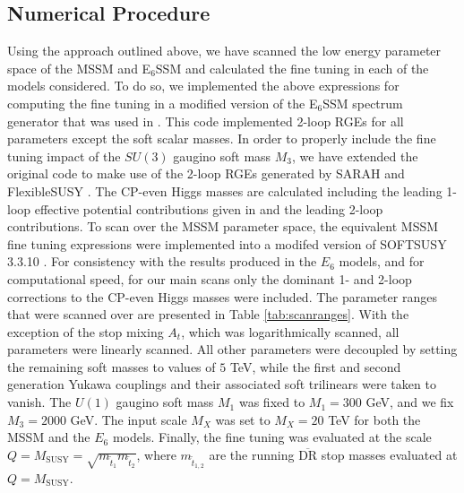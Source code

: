 \documentclass[preprint,amsmath,amssymb,aps,superscriptaddress,prd,showpacs,floatfix]{revtex4-1}
\begin{document}
\subsection{\label{subsec:numericalprocedure}Numerical Procedure}
Using the approach outlined above, we have scanned the low energy parameter space of the MSSM and E$_6$SSM and calculated the fine tuning in each of the models considered. To do so, we implemented the above expressions for computing the fine tuning in a modified version of the E$_6$SSM spectrum generator that was used in \cite{Athron:2013ipa}. This code implemented 2-loop RGEs for all parameters except the soft scalar masses. In order to properly include the fine tuning impact of the $SU(3)$ gaugino soft mass $M_3$, we have extended the original code to make use of the 2-loop RGEs generated by SARAH \cite{Staub:2009bi,Staub:2010jh,Staub:2012pb,Staub:2013tta} and FlexibleSUSY \cite{Athron:2014yba}. The CP-even Higgs masses are calculated including the leading 1-loop effective potential contributions given in \cite{Athron:2009bs} and the leading 2-loop contributions. To scan over the MSSM parameter space, the equivalent MSSM fine tuning expressions were implemented into a modifed version of SOFTSUSY 3.3.10 \cite{Allanach:2001kg,Allanach:2013kza}. For consistency with the results produced in the $E_6$ models, and for computational speed, for our main scans only the dominant 1- and 2-loop corrections to the CP-even Higgs masses were included. The parameter ranges that were scanned over are presented in Table \ref{tab:scanranges}. With the exception of the stop mixing $A_t$, which was logarithmically scanned, all parameters were linearly scanned. All other parameters were decoupled by setting the remaining soft masses to values of $5$ TeV, while the first and second generation Yukawa couplings and their associated soft trilinears were taken to vanish. The $U(1)$ gaugino soft mass $M_1$ was fixed to $M_1=300$ GeV, and we fix $M_3=2000$ GeV. The input scale $M_X$ was set to $M_X=20$ TeV for both the MSSM and the $E_6$ models. Finally, the fine tuning was evaluated at the scale $Q=M_{\textrm{SUSY}}=\sqrt{m_{\tilde{t}_1}m_{\tilde{t}_2}}$, where $m_{\tilde{t}_{1,2}}$ are the running $\overline{\textrm{DR}}$ stop masses evaluated at $Q=M_{\textrm{SUSY}}$. 
\end{document}
